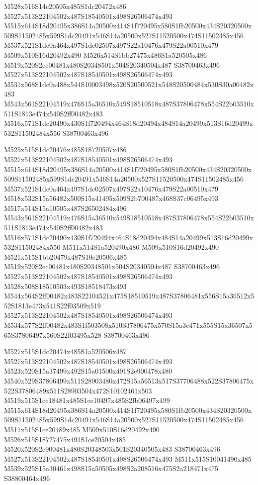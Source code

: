 \documentclass{article}
\begin{document}
\begin{multicols}{2}
M528x516S14c20505x485S1dc20472x486 M527x513S22104502x487S18540501x498S26506474x493 M515x614S18d20495x386S14a20500x414S1f720495x580S1fb20500x434S20320500x509S11502485x599S1dc20491x546S14a20500x527S11520500x474S11502485x456 M537x521S1dc0a464x497S1dc02507x497S22a10476x479S22a00510x479 M509x510S16d20492x490 M526x514S1bb27475x486S1a520505x486 M519x520S2ec00481x480S20348501x504S20340504x487 S38700463x496 M527x513S22104502x487S18540501x498S26506474x493 M531x568S1dc0a488x544S10003498x520S20500521x548S20500484x530S30a00482x483 M543x561S22104519x476S15a36510x549S18510518x487S37806478x554S22b03510x511S1813e474x540S2ff00482x483 M516x571S1dc20490x430S1f720494x464S18d20494x484S14a20499x513S16d20499x532S11502484x556 S38700463x496

M525x515S1dc20476x485S18720507x486 M527x513S22104502x487S18540501x498S26506474x493 M515x614S18d20495x386S14a20500x414S1f720495x580S1fb20500x434S20320500x509S11502485x599S1dc20491x546S14a20500x527S11520500x474S11502485x456 M537x521S1dc0a464x497S1dc02507x497S22a10476x479S22a00510x479 M518x532S15a56482x500S15a41495x509S2b700487x468S37c06495x493 M517x514S15a10505x487S26502484x496 M543x561S22104519x476S15a36510x549S18510518x487S37806478x554S22b03510x511S1813e474x540S2ff00482x483 M516x571S1dc20490x430S1f720494x464S18d20494x484S14a20499x513S16d20499x532S11502484x556 M511x514S1a520490x486 M509x510S16d20492x490 M521x515S1bb20479x487S10e20506x485 M519x520S2ec00481x480S20348501x504S20340504x487 S38700463x496 M527x513S22104502x487S18540501x498S26506474x493 M528x508S18510503x493S18518473x493 M544x564S2ff00482x483S22104521x475S18510519x487S37806481x556S15a36512x552S1813e473x541S22f03509x519 M527x513S22104502x487S18540501x498S26506474x493 M534x577S2ff00482x483S1f503508x510S37806475x570S15a3e471x555S15a36507x565S37806497x560S22f03495x528 S38700463x496

M527x515S1dc20474x485S1a520506x487 M527x513S22104502x487S18540501x498S26506474x493 M523x520S15a37499x492S15a01500x491S2e900478x480 M540x529S37806499x511S28903480x472S15a56513x517S37706488x522S37806475x522S37806489x511S28903504x472S10102461x503 M519x515S1ce18481x485S1ce10497x485S2fb06497x499 M515x614S18d20495x386S14a20500x414S1f720495x580S1fb20500x434S20320500x509S11502485x599S1dc20491x546S14a20500x527S11520500x474S11502485x456 M511x515S1ce20489x485 M509x510S16d20492x490 M526x515S18727475x491S1ce20504x485 M520x520S2e900481x480S20348503x501S20340505x483 S38700463x496 M527x513S22104502x487S18540501x498S26506474x493 M511x515S10041490x485 M539x525S15a30461x498S15a50505x498S2a208516x475S2a218471x475 S38800464x496


\end{multicols}
\end{document}
